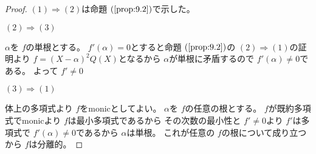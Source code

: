 \documentclass[../master_galois_theory]{subfiles}
\begin{document}
\begin{proof}
  $(1) \Rightarrow (2)$は命題 $(\mathrm{\ref{prop:9.2}})$で示した。

  $(2) \Rightarrow (3)$

  $\alpha$を $f$の単根とする。
  $f'(\alpha) = 0$とすると命題 $(\mathrm{\ref{prop:9.2}})$の $(2) \Rightarrow (1)$の証明より
  $f = (X - \alpha)^2 Q(X)$となるから $\alpha$が単根に矛盾するので $f'(\alpha) \neq 0$である。
  よって $f' \neq 0$

  $(3) \Rightarrow (1)$

  体上の多項式より $f$を\rm{monic}としてよい。
  $\alpha$を $f$の任意の根とする。
  $f$が既約多項式で\rm{monic}より $f$は最小多項式であるから
  その次数の最小性と $f' \neq 0$より
  $f'$は多項式で $f'(\alpha) \neq 0$であるから $\alpha$は単根。
  これが任意の $f$の根について成り立つから $f$は分離的。
\end{proof}
\end{document}
